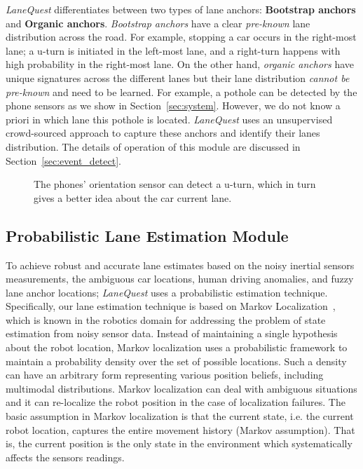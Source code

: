\documentclass[10pt, conference, compsocconf]{IEEEtran}
\def \sys {\textit{LaneQuest}}
\begin{document}
\sys{} differentiates between two types of lane anchors: \textbf{Bootstrap anchors} and \textbf{Organic anchors}. \emph{Bootstrap anchors} have a clear \emph{pre-known} lane distribution across the road. For example, stopping a car occurs in the right-most lane; a u-turn is initiated in the left-most lane, and a right-turn happens with high probability in the right-most lane. On the other hand, \emph{organic anchors} have unique signatures across the different lanes but their lane distribution \emph{cannot be pre-known} and need to be learned. For example, a pothole can be detected by the phone sensors as we show in Section~\ref{sec:system}. However, we do not know a priori in which lane this pothole is located. \sys{} uses an unsupervised crowd-sourced approach to capture these anchors and identify their lanes distribution. 
The details of operation of this module are discussed in Section~\ref{sec:event_detect}.
\begin{figure}[!t]
\centering
    \hspace{2pt}
\caption{The phones' orientation sensor can detect a u-turn, which in turn gives a better idea about the car current lane.}
\label{fig:uturn_ex}
\end{figure}
\subsection{Probabilistic Lane Estimation Module}
To achieve robust and accurate lane estimates based on the noisy inertial sensors measurements, the ambiguous car locations, human driving anomalies, and fuzzy lane anchor locations; \sys{} uses a probabilistic estimation technique. Specifically, our lane estimation technique is based on Markov Localization~\cite{russell1995artificial,burgard1999markov}, which is known in the robotics domain for addressing the problem of state estimation from noisy sensor data. Instead of maintaining a single hypothesis about the robot location, Markov localization uses a probabilistic
framework to maintain a probability density over the set of possible locations. Such a density can have an arbitrary form representing various position beliefs, including multimodal distributions. Markov localization can deal with ambiguous situations and it can re-localize the robot position in the case of localization
failures. The basic assumption in Markov localization is that the current state, i.e. the current robot location, captures the entire movement history (Markov assumption). That is, the current position is the only state in the environment which systematically affects the sensors readings.
\end{document}
